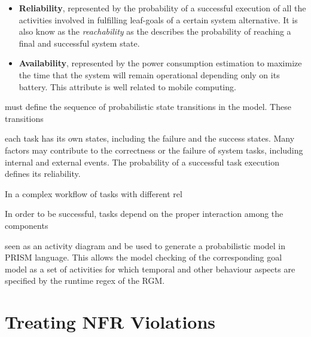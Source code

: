 \begin{itemize}

\item \textbf{Reliability}, represented by the probability of a successful execution of all the activities involved in fulfilling leaf-goals of a certain system alternative. It is also know as the \textit{reachability} as the describes the probability of reaching a final and successful system state. 
\bigskip

\item \textbf{Availability}, represented by the power consumption estimation to maximize the time that the system will remain operational depending only on its battery. This attribute is well related to mobile computing. 
\medskip

\end{itemize}



must define the sequence of probabilistic state transitions in the model. These transitions 


each task has its own states, including the failure and the success states. Many factors may contribute to the correctness or the failure of system tasks, including internal and external events. The probability of a successful task execution defines its reliability. 

In a complex workflow of tasks with different rel 


 In order to be successful, tasks depend on the proper interaction among the components 

seen as an activity diagram and be used to generate a probabilistic model in PRISM language. This allows the model checking of the corresponding goal model as a set of activities for which temporal and other behaviour aspects are specified by the runtime regex of the RGM.

\section{Treating NFR Violations}

